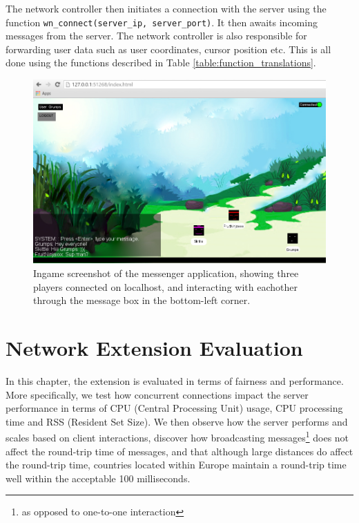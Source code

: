 \documentclass[bsc, 12pt, twoside, singlespacing, parskip, abbrevs, notimes, normalheadings, logo]{styles/infthesis}
\begin{document}
The network controller then initiates a connection with the server using the function \texttt{wn\_connect(server\_ip, server\_port)}. It then awaits incoming messages from the server. The network controller is also responsible for forwarding user data such as user coordinates, cursor position etc. This is all done using the functions described in Table \ref{table:function_translations}.
\vspace{4em}

\begin{figure}[H]
\centering
\includegraphics[scale=0.44]{images/messenger.jpg}
\caption{Ingame screenshot of the messenger application, showing three players connected on localhost, and interacting with eachother through the message box in the bottom-left corner.}
\label{fig:messenger}
\end{figure}



\chapter{Network Extension Evaluation}
In this chapter, the extension is evaluated in terms of fairness and performance. More specifically, we test how concurrent connections impact the server performance in terms of CPU (Central Processing Unit) usage, CPU processing time and RSS (Resident Set Size). We then observe how the server performs and scales based on client interactions, discover how broadcasting messages\footnote{as opposed to one-to-one interaction} does not affect the round-trip time of messages, and that although large distances do affect the round-trip time, countries located within Europe maintain a round-trip time well within the acceptable 100 milliseconds.
\end{document}
